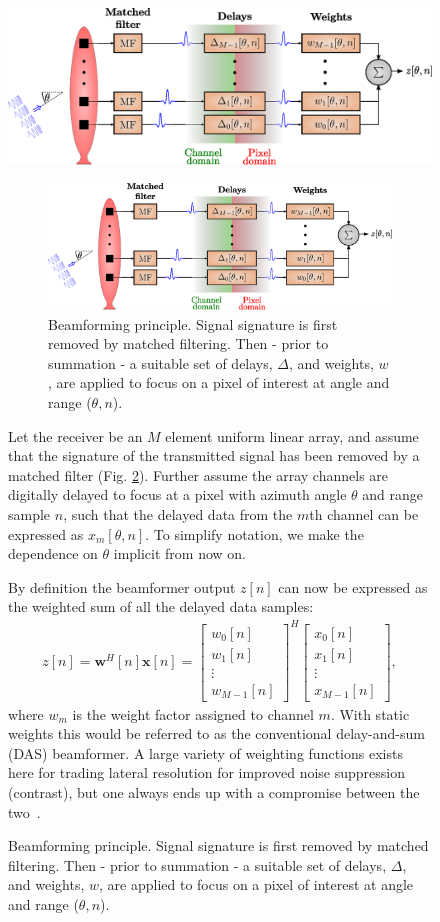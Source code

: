\documentclass[12pt,journal,draftclsnofoot,onecolumn]{IEEEtran}
\let\MYoriglatexcaption\caption               %
\renewcommand{\caption}[2][\relax]{\MYoriglatexcaption[#2]{#2}}
\newcommand\bmat[1]{\begin{bmatrix}#1\end{bmatrix}}
\renewcommand\H{^{\scriptscriptstyle H}}
\renewcommand\vec[1]{\boldsymbol{#1}}
\newcommand\1{\vec 1}
\newcommand*\w{\vec w}
\newcommand*\x{\vec x}
\begin{document}
\ifPeerReview
\begin{figure}[H]\centering
\includegraphics[width=0.8\linewidth]{gfx/buske1.eps}
\else
\begin{figure}[!t]\centering
\includegraphics[width=\linewidth]{gfx/beamforming.eps}
\fi%
\caption{Beamforming principle. Signal signature is first removed by matched filtering. Then - prior to summation - a suitable set of delays, $\Delta$, and weights, $w$, are applied to focus on a pixel of interest at angle and range ($\theta,n$).}\label{beamforming}
\end{figure}
Let the receiver be an $M$ element uniform linear array, and assume that the signature of the transmitted signal has been removed by a matched filter (Fig. \ref{beamforming}). Further assume the array channels are digitally delayed to focus at a pixel with azimuth angle $\theta$ and range sample $n$, such that the delayed data from the $m$th channel can be expressed as $x_m[\theta,n]$. To simplify notation, we make the dependence on $\theta$ implicit from now on. 

By definition the beamformer output $z[n]$ can now be expressed as the weighted sum of all the delayed data samples:
\begin{align}
z[n] = \w\H[n]\x[n] = \bmat{w_0[n]\\w_1[n]\\\vdots\\w_{M-1}[n]}^H \bmat{x_0[n]\\x_1[n]\\\vdots\\x_{M-1}[n]},\label{z}
\end{align}
where $w_m$ is the weight factor assigned to channel $m$. With static weights this would be referred to as the conventional delay-and-sum (DAS) beamformer. A large variety of weighting functions exists here for trading lateral resolution for improved noise suppression (contrast), but one always ends up with a compromise between the two~\cite{Harris1978}.


\end{figure}
\end{document}
